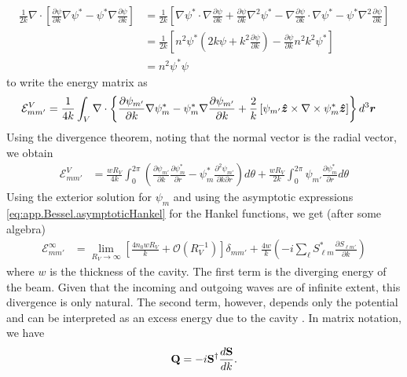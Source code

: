   \begin{align*}
   \frac{1}{2k}\nabla\cdot\left[\frac{\partial\psi}{\partial k}\nabla\psi^*-\psi^*\nabla\frac{\partial\psi}{\partial k}\right]
	&= \frac{1}{2k}\left[\nabla\psi^*\cdot\nabla\frac{\partial\psi}{\partial k}+\frac{\partial\psi}{\partial k}\nabla^2\psi^*
			  -\nabla\frac{\partial\psi}{\partial k}\cdot\nabla\psi^*-\psi^*\nabla^2\frac{\partial\psi}{\partial k}\right]	\\
	&= \frac{1}{2k}\left[n^2\psi^*\left(2k\psi+k^2\frac{\partial\psi}{\partial k}\right)-\frac{\partial\psi}{\partial k}n^2k^2\psi^*\right]\\
	&= n^2\psi^*\psi
  \end{align*}
to write the energy matrix as
  \begin{align*}
    \mathcal{E}^V_{mm'} &= \frac{1}{4k}\int_V\nabla\cdot
			    \left\{
			      \frac{\partial\psi_{m'}}{\partial k}\nabla\psi^*_{m}-\psi^*_m\nabla\frac{\partial\psi_{m'}}{\partial k}
			+   \frac{2}{k}\left[\psi_{m'}\boldsymbol{\hat{z}}\times\nabla\times\psi^*_m\boldsymbol{\hat{z}}\right]\right\}d^3\boldsymbol{r}
  \end{align*}
Using the divergence theorem, noting that the normal vector
is the radial vector, we obtain
  \begin{align*}
    \mathcal{E}^V_{mm'}	&= \frac{wR_V}{4k}
			  \int_0^{2\pi}\left(\frac{\partial\psi_{m'}}{\partial k}\frac{\partial\psi^*_m}{\partial r}
					      -\psi^*_m\frac{\partial^2\psi_{m'}}{\partial k\partial r}\right)d\theta	\nonumber
			+\frac{wR_V}{2k}
			  \int_0^{2\pi}\psi_{m'}\frac{\partial\psi^*_m}{\partial r} d\theta
  \end{align*}
Using the exterior solution for $\psi_m$ and using the 
asymptotic expressions \eqref{eq:app.Bessel.asymptoticHankel} for the Hankel functions, we get
(after some algebra)
  \begin{align}
   \mathcal{E}^{\infty}_{mm'} &= \lim_{R_V\rightarrow\infty}\left[\frac{4n_0wR_V}{k}+\mathcal{O}(R_V^{-1})\right]\delta_{mm'}
			      + \frac{4w}{k}\left(-i\sum_\ell S^*_{\ell m}\frac{\partial S_{\ell m'}}{\partial k}\right)
  \end{align}
where $w$ is the thickness of the cavity. The first term is the 
diverging energy of the beam. Given that the incoming 
and outgoing waves are of infinite extent, this divergence
is only natural. The second term, however, depends only the
potential and can be interpreted as an excess energy due to the
cavity \cite{GAP2013a}. In matrix notation, we have
  \begin{equation}
  	\label{eq:passive.formalism.qMatrixDef}
    \mathbf{Q} = -i\mathbf{S}^\dagger\frac{d\mathbf{S}}{dk}.
  \end{equation}
